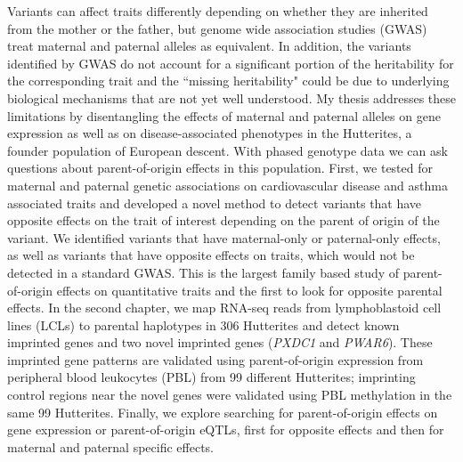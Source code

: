 \abstract

Variants can affect traits differently depending on whether they are inherited from the mother or the father, but genome wide association studies (GWAS) treat maternal and paternal alleles as equivalent. In addition, the variants identified by GWAS do not account for a significant portion of the heritability for the corresponding trait and the ``missing heritability" could be due to underlying biological mechanisms that are not yet well understood. My thesis addresses these limitations by disentangling the effects of maternal and paternal alleles on gene expression as well as on disease-associated phenotypes in the Hutterites, a founder population of European descent. With phased genotype data we can ask questions about parent-of-origin effects in this population. First, we tested for maternal and paternal genetic associations on cardiovascular disease and asthma associated traits and developed a novel method to detect variants that have opposite effects on the trait of interest depending on the parent of origin of the variant. We identified variants that have maternal-only or paternal-only effects, as well as variants that have opposite effects on traits, which would not be detected in a standard GWAS. This is the largest family based study of parent-of-origin effects on quantitative traits and the first to look for opposite parental effects. In the second chapter, we map RNA-seq reads from lymphoblastoid cell lines (LCLs) to parental haplotypes in 306  Hutterites and detect known imprinted genes and two novel imprinted genes (\emph{PXDC1} and \emph{PWAR6}). These imprinted gene patterns are validated using parent-of-origin expression from peripheral blood leukocytes (PBL)  from 99 different Hutterites; imprinting control regions near the novel genes were validated using PBL methylation in the same 99 Hutterites. Finally, we explore searching for parent-of-origin effects on gene expression or parent-of-origin eQTLs, first for opposite effects and then for maternal and paternal specific effects. 
